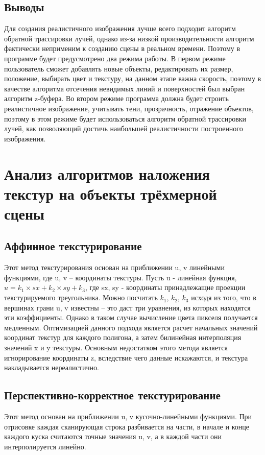 \documentclass[12pt,a4paper,oneside]{report}
\begin{document}
 	\subsection {Выводы}
 	 \quad Для создания реалистичного изображения лучше всего подходит алгоритм обратной трассировки лучей, однако из-за низкой производительности алгоритм фактически неприменим к созданию сцены в реальном времени. Поэтому в программе будет предусмотрено два режима работы. В первом режиме пользователь сможет добавлять новые объекты, редактировать их размер, положение, выбирать цвет и текстуру, на данном этапе важна скорость, поэтому в качестве алгоритма отсечения невидимых линий и поверхностей был выбран алгоритм z-буфера. Во втором режиме программа должна будет строить реалистичное изображение, учитывать тени, прозрачность, отражение объектов, поэтому в этом режиме будет использоваться алгоритм обратной трассировки лучей, как позволяющий достичь наибольшей реалистичности построенного изображения.
 	
 	\section {Анализ алгоритмов наложения текстур на объекты трёхмерной сцены}
 	\subsection{Аффинное текстурирование}
 	 \quad Этот метод текстурирования основан на приближении u, v линейными функциями, где u, v – координаты текстуры. Пусть u - линейная функция, $u = k_1 \times sx + k_2 \times sy + k_3$, где sx, sy - координаты принадлежащие проекции текстурируемого треугольника. Можно посчитать $k_1$, $k_2$, $k_3$ исходя из того, что в вершинах грани u, v известны -- это даст три уравнения, из которых находятся эти коэффициенты. Однако в таком случае вычисление цвета пикселя получается медленным. Оптимизацией данного подхода является расчет начальных значений координат текстур для каждого полигона, а затем билинейная интерполяция значений x и y текстуры. Основным недостатком этого метода является игнорирование координаты z, вследствие чего данные искажаются, и текстура накладывается нереалистично.
 	
 	\subsection{Перспективно-корректное текстурирование}
 	\quad Этот метод основан на приближении u, v кусочно-линейными функциями. При отрисовке каждая сканирующая строка разбивается на части, в начале и конце каждого куска считаются точные значения u, v, а в каждой части они интерполируется линейно.
 	
\end{document}
